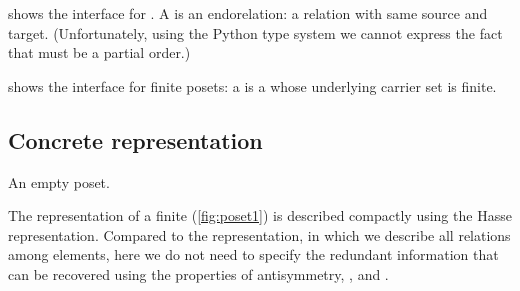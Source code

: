 

 shows the interface for .
A  is an endorelation: a relation with same source and target.
(Unfortunately, using the Python type system we cannot express the fact that  must be a partial order.)

 shows the interface for finite posets: a  is a  whose underlying carrier set is finite.




\begin{figure}[h!]
    \caption{}
    \label{fig:poset-finiteposet}
\end{figure}

\subsection{Concrete representation}
\begin{marginfigure}
    \caption{}
    \label{fig:poset1}
\end{marginfigure}
\begin{marginfigure}
    \caption{An empty poset.}
    \label{fig:poset_empty}
\end{marginfigure}

The representation of a finite  (\cref{fig:poset1}) is described compactly using the Hasse representation.
Compared to the  representation, in which we describe all relations among elements, here we do not need to specify the redundant information that can be recovered using the properties of antisymmetry, , and .


